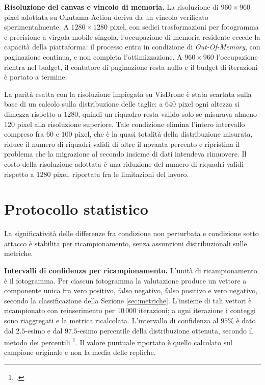\documentclass[a4paper,12pt]{report}
\begin{document}
\textbf{Risoluzione del canvas e vincolo di memoria.}
\label{sec:risoluzione}
La risoluzione di $960 \times 960$ pixel adottata su Okutama-Action deriva da un
vincolo verificato sperimentalmente. A $1280 \times 1280$ pixel, con sedici
trasformazioni per fotogramma e precisione a virgola mobile singola,
l'occupazione di memoria residente eccede la capacità della piattaforma: il
processo entra in condizione di \textit{Out-Of-Memory}, con paginazione
continua, e non completa l'ottimizzazione. A $960 \times 960$ l'occupazione
rientra nel budget, il contatore di paginazione resta nullo e il budget di
iterazioni è portato a termine.

La parità esatta con la risoluzione impiegata su VisDrone è stata scartata sulla
base di un calcolo sulla distribuzione delle taglie: a $640$ pixel ogni altezza
si dimezza rispetto a $1280$, quindi un riquadro resta valido solo se misurava
almeno $120$ pixel alla risoluzione superiore. Tale condizione elimina l'intero
intervallo compreso fra $60$ e $100$ pixel, che è la quasi totalità
della distribuzione misurata, riduce il numero di riquadri validi di oltre il
novanta percento e ripristina il problema che la migrazione al secondo insieme
di dati intendeva rimuovere. Il costo della risoluzione adottata è una riduzione
del numero di riquadri validi rispetto a $1280$ pixel, riportata fra le
limitazioni del lavoro.

\section{Protocollo statistico}
\label{sec:protocollo}

La significatività delle differenze fra condizione non perturbata e condizione
sotto attacco è stabilita per ricampionamento, senza assunzioni distribuzionali
sulle metriche.

\textbf{Intervalli di confidenza per ricampionamento.}
\label{sec:bootstrap}
L'unità di ricampionamento è il fotogramma. Per ciascun fotogramma la
valutazione produce un vettore a componente unica fra vero positivo, falso
negativo, falso positivo e vero negativo, secondo la classificazione della
Sezione \ref{sec:metriche}. L'insieme di tali vettori è ricampionato con
reinserimento per $10\,000$ iterazioni; a ogni iterazione i conteggi sono
riaggregati e la metrica ricalcolata. L'intervallo di confidenza al $95\%$ è
dato dal $2.5$-esimo e dal $97.5$-esimo percentile della distribuzione ottenuta,
secondo il metodo dei percentili \footcite{efron_1993_bootstrap}. Il valore
puntuale riportato è quello calcolato sul campione originale e non la media
delle repliche.
\end{document}
